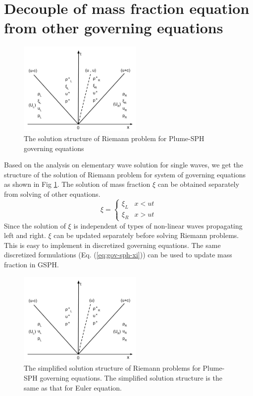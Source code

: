 \section{Decouple of mass fraction equation from other governing equations}
\begin{figure}
\center
\includegraphics[width=6cm]{Chapter-2/Figures/Solution_Structure_RP}
\caption{The solution structure of Riemann problem for Plume-SPH governing equations}
\label{fig:Solution_Structure_RP}
\end{figure}
Based on the analysis on elementary wave solution for single waves, we get the structure of the solution of Riemann problem for system of governing equations as shown in Fig \ref{fig:Solution_Structure_RP}. The solution of mass fraction $\xi$ can be obtained separately from solving of other equations.
\begin{equation}
\xi =  \begin{cases} 
      \xi_L & x< ut\\
      \xi_R & x > ut
\end{cases}
\label{eq:RP_solution_xi}
\end{equation}
Since the solution of $\xi$ is independent of types of non-linear waves propagating left and right. $\xi$ can be updated separately before solving Riemann problems. This is easy to implement in discretized governing equations. The same discretized formulations (Eq. (\ref{eq:gov-sph-xi})) can be used to update mass fraction in GSPH.
\begin{figure}
\center
\includegraphics[width=6cm]{Chapter-2/Figures/Solution_Structure_RP_simplified}
\caption{The simplified solution structure of Riemann problems for Plume-SPH governing equations. The simplified solution structure is the same as that for Euler equation.}
\label{fig:Solution_Structure_RP_simplified}
\end{figure}
